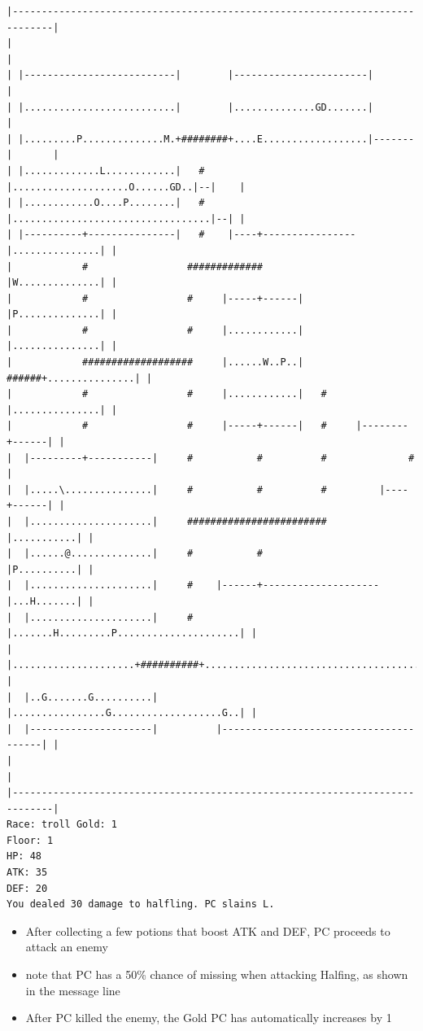\documentclass[11pt]{article}
\theoremstyle{plain}
\begin{document}
\begin{Verbatim}[fontsize=\scriptsize]
|-----------------------------------------------------------------------------|
|                                                                             |
| |--------------------------|        |-----------------------|               |
| |..........................|        |..............GD.......|               |
| |.........P..............M.+########+....E..................|-------|       |
| |.............L............|   #    |....................O......GD..|--|    |
| |............O....P........|   #    |..................................|--| |
| |----------+---------------|   #    |----+----------------|...............| |
|            #                 #############                |W..............| |
|            #                 #     |-----+------|         |P..............| |
|            #                 #     |............|         |...............| |
|            ###################     |......W..P..|   ######+...............| |
|            #                 #     |............|   #     |...............| |
|            #                 #     |-----+------|   #     |--------+------| |
|  |---------+-----------|     #           #          #              #        |
|  |.....\...............|     #           #          #         |----+------| |
|  |.....................|     ########################         |...........| |
|  |......@..............|     #           #                    |P..........| |
|  |.....................|     #    |------+--------------------|...H.......| |
|  |.....................|     #    |.......H.........P.....................| |
|  |.....................+##########+.......................................| |
|  |..G.......G..........|          |................G...................G..| |
|  |---------------------|          |---------------------------------------| |
|                                                                             |
|-----------------------------------------------------------------------------|
Race: troll Gold: 1                                                    Floor: 1
HP: 48
ATK: 35
DEF: 20
You dealed 30 damage to halfling. PC slains L.
\end{Verbatim}

\begin{itemize}
    \item After collecting a few potions that boost ATK and DEF, PC
          proceeds to attack an enemy
    \item note that PC has a 50\% chance of missing when attacking Halfing,
          as shown in the message line
    \item After PC killed the enemy, the Gold PC has automatically increases by 1
\end{itemize}
\end{document}
